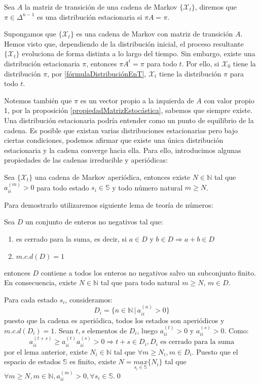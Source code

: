 \begin{definition}
Sea $A$ la matriz de transición de una cadena de Markov $\{\mathcal{X}_t\}$, diremos que $\pi\in\Delta^{n-1}$ es una distribución estacionaria si $\pi A=\pi$.
\end{definition}

Supongamos que $\{\mathcal{X}_t\}$ es una cadena de Markov con matriz de transición $A$. Hemos visto que, dependiendo de la distribución inicial, el proceso resultante $\{\mathcal{X}_t\}$ evoluciona de forma distinta a lo largo del tiempo. Sin embargo, existe una distribución estacionaria $\pi$, entonces $\pi A^t=\pi$ para todo $t$. Por ello, si $\mathcal{X}_0$ tiene la distribución $\pi$, por \ref{fórmulaDistribuciónEnT}, $\mathcal{X}_t$ tiene la distribución $\pi$ para todo $t$.

Notemos también que $\pi$ es un vector propio a la izquierda de $A$ con valor propio 1, por la proposición \ref{propiedadMatrizEstocástica}, sabemos que siempre existe. Una distribución estacionaria podría entender como un punto de equilibrio de la cadena. Es posible que existan varias distribuciones estacionarias pero bajo ciertas condiciones, podemos afirmar que existe una única distribución estacionaria y la cadena converge hacia ella. Para ello, introducimos algunas propiedades de las cadenas irreducible y aperiódicas:

\begin{proposition}\label{propiedadCadenaAperiódica}
    Sea $\{\mathcal{X}_t\}$ una cadena de Markov aperiódica, entonces existe $N\in\mathbb{N}$ tal que $a_{ii}^{(m)}>0$ para todo estado $s_i\in\mathbb{S}$ y todo número natural $m\geq N$.
\end{proposition}
Para demostrarlo utilizaremos siguiente lema de teoría de números:
\begin{lemma}
Sea $D$ un conjunto de enteros no negativos tal que:
\begin{enumerate}
    \item es cerrado para la suma, es decir, si $a\in D$ y $b\in D\Longrightarrow a+b\in D$
    \item $m.c.d(D)=1$
\end{enumerate}
entonces $D$ contiene a todos los enteros no negativos salvo un subconjunto finito. En consecuencia, existe $N\in\mathbb{N}$ tal que para todo natural $m\geq N$, $m\in D$.
\end{lemma}

\begin{proofs*}
Para cada estado $s_i$, consideramos:
\[D_i=\{n\in\mathbb{N}\,|\, a_{ii}^{(n)}>0\}\]
puesto que la cadena es aperiódica, todos los estados son aperiódicos y $m.c.d(D_i)=1$. Sean $t,s$ elementos de $D_i$, luego $a_{ii}^{(t)}>0$ y $a_{ii}^{(s)}>0$. Como:
\[a_{ii}^{(t+s)}\geq a_{ii}^{(t)}a_{ii}^{(s)}>0\Longrightarrow t+s\in D_i,D_i \text{ es cerrado para la suma}\]
por el lema anterior, existe $N_i\in\mathbb{N}$ tal que $\forall m\geq N_i, m\in D_i$. Puesto que el espacio de estados $\mathbb{S}$ es finito, existe $N=\underset{s_i\in\mathbb{S}}{max}\{N_i\}$ tal que $\forall m\geq N, m\in\mathbb{N}, a_{ii}^{(m)}>0, \forall s_i\in\mathbb{S}$.\qed
\end{proofs*}

